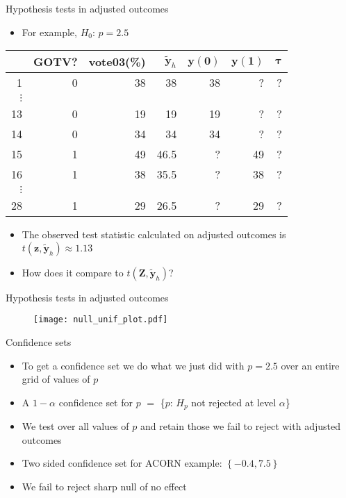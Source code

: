 \documentclass[table, xcolor = {dvipsnames}, 9pt]{beamer}
\theoremstyle{plain}
\begin{document}
\begin{frame}{Hypothesis tests in adjusted outcomes}
\begin{itemize}
\item For example, $H_0$: $p = 2.5$  
\end{itemize}
\begin{center}
  \begin{tabular}{r|rr|rrrr}
  \hline
 & GOTV? & vote03(\%)& $\bm{\tilde{y}}_h$ & $\bm{y}(\bm{0})$ & $\bm{y}(\bm{1})$ & $\bm{\tau}$\\
  \hline
1 & 0 & 38 & 38 & 38 & ? & ?\\
$\vdots$& & & & & & \\
13 & 0 & 19 & 19 & 19& ? & ?\\
14 & 0 & 34 & 34 & 34& ? & ?\\
15 & 1 & 49 & 46.5 & ?& 49 & ?\\
16 & 1 & 38 & 35.5 & ?& 38 & ?\\
$\vdots$& & & & & & \\
28 & 1 & 29 & 26.5 & ?& 29 & ? \\
   \hline
\end{tabular}
\end{center}
\begin{itemize}
\item The observed test statistic calculated on adjusted outcomes is $t(\bm{z}, \bm{\tilde{y}}_h) \approx 1.13$
\item How does it compare to $t\left(\bm{Z}, \bm{\tilde{y}}_h\right)$?
\end{itemize}
\end{frame}
\begin{frame}{Hypothesis tests in adjusted outcomes}
\begin{figure}[H]
\texttt{[image: null\_unif\_plot.pdf]}
\end{figure}
\end{frame}
\begin{frame}{Confidence sets}
\vfill
\begin{itemize} \vfill
\item To get a confidence set we do what we just did with $p = 2.5$ over an entire grid of values of $p$ \vfill
\item A $1-\alpha$ confidence set for $p$ $= $ \{$p$: $H_{p}$ not rejected at level $\alpha$\} \vfill
\item We test over all values of $p$ and retain those we fail to reject with adjusted outcomes \vfill
\item Two sided confidence set for ACORN example: $\left\{-0.4, 7.5\right\}$ \vfill
\item We fail to reject sharp null of no effect \vfill
\end{itemize}
\end{frame}
\end{document}
